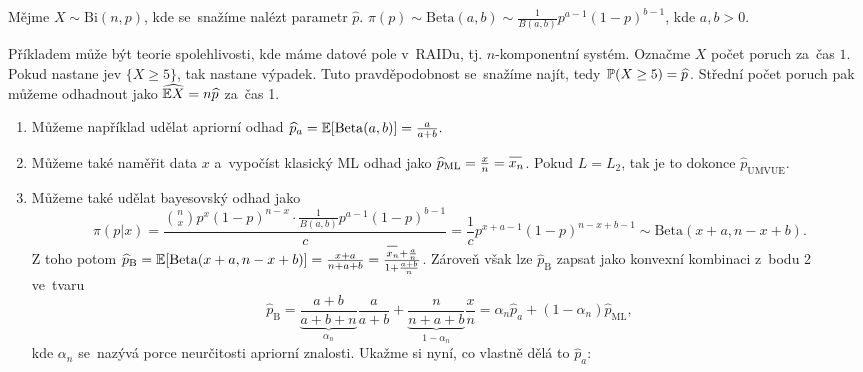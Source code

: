 \begin{example}
	Mějme $X\sim \mathrm{Bi}(n,p)$, kde se~snažíme nalézt parametr $\widehat{p}$. $\pi(p)\sim\mathrm{Beta}(a,b)\sim\frac{1}{B(a,b)}p^{a-1}(1-p)^{b-1}$, kde $a,b>0$. 
	
	Příkladem může být teorie spolehlivosti, kde máme datové pole v~RAIDu, tj. $n$-komponentní systém. Označme $X$ počet poruch za~čas $1$. Pokud nastane jev $\{X\geq5\}$, tak nastane výpadek. Tuto pravděpodobnost se~snažíme najít, tedy $\mathbb{P}(X\geq5)=\widehat{p}$. Střední počet poruch pak můžeme odhadnout jako $\widehat{\mathbb{E} X}=n\widehat{p}$ za~čas 1.
	
	 \begin{enumerate}[1)]
		\item Můžeme například udělat apriorní odhad $\widehat{p}_a=\mathbb{E}[\mathrm{Beta}(a,b)]=\frac{a}{a+b}.$
		\item Můžeme také naměřit data $x$ a~vypočíst klasický ML odhad jako $\widehat{p}_\mathrm{ML}=\frac{x}{n}=\oxnn$. Pokud $L=L_2$, tak je to dokonce $\widehat{p}_\mathrm{UMVUE}$.
		\item Můžeme také udělat bayesovský odhad jako $$\pi(p|x)=\frac{\binom{n}{x}p^x(1-p)^{n-x}\cdot\frac{1}{B(a,b)}p^{a-1}(1-p)^{b-1}}{c}=\frac{1}{c}p^{x+a-1}(1-p)^{n-x+b-1}\sim\mathrm{Beta}(x+a,n-x+b).$$
		Z toho potom $\widehat{p}_\mathrm{B}=\E [\mathrm{Beta}(x+a,n-x+b)]=\frac{x+a}{n+a+b}=\frac{\oxnn+\frac{a}{n}}{1+\frac{a+b}{n}}$. Zároveň však lze $\widehat{p}_\mathrm{B}$ zapsat jako konvexní kombinaci z~bodu 2 ve~tvaru
		$$ \widehat{p}_\mathrm{B}=\underbrace{\frac{a+b}{a+b+n}}_{\alpha_n}\frac{a}{a+b}+\underbrace{\frac{n}{n+a+b}}_{1-\alpha_n}\frac{x}{n}=\alpha_n\widehat{p}_a+(1-\alpha_n)\widehat{p}_\mathrm{ML},$$ kde $\alpha_n$ se~nazývá porce neurčitosti apriorní znalosti. Ukažme si nyní, co vlastně dělá to $\widehat{p}_a$:
			\begin{figure}[h]
			\centering
\end{figure}
\end{enumerate}
\end{example}
